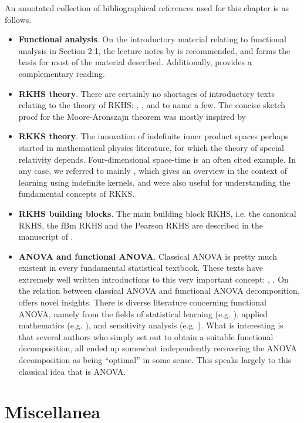 \documentclass[a4paper,showframe,11pt]{report}
\begin{document}
An annotated collection of bibliographical references used for this chapter is as follows.
\begin{itemize}
  \item \textbf{Functional analysis}. On the introductory material relating to functional analysis in Section 2.1, the lecture notes by \citet{sejdinovic2012} is recommended, and forms the basis for most of the material described. Additionally, \citet{rudin1987real} provides a complementary reading.
  \item \textbf{RKHS theory}. There are certainly no shortages of introductory texts relating to the theory of RKHS: \citet{steinwart2008support}, \citet{berlinet2011reproducing}, and \citet{gu2013smoothing} to name a few. The concise sketch proof for the Moore-Aronszajn theorem was mostly inspired by \citet[Theorem 4]{hein2004kernels}
  \item \textbf{RKKS theory}. The innovation of indefinite inner product spaces perhaps started in mathematical physics literature, for which the theory of special relativity depends. Four-dimensional space-time is an often cited example. In any case, we referred to mainly \citet{ong2004learning}, which gives an overview in the context of learning using indefinite kernels. \citet{alpay1991some} and \citet{zafeiriou2012subspace} were also useful for understanding the fundamental concepts of RKKS.
  \item \textbf{RKHS building blocks}. The main building block RKHS, i.e. the canonical RKHS, the fBm RKHS and the Pearson RKHS are described in the manuscript of \citet{bergsma2017}.
  \item \textbf{ANOVA and functional ANOVA}. Classical ANOVA is pretty much existent in every fundamental statistical textbook. These texts have extremely well written introductions to this very important concept: \citet[Ch. 11]{casella2002statistical}, \citet[Ch. 3]{dean1999design}. On the relation between classical ANOVA and functional ANOVA decomposition, \citet{gu2013smoothing} offers novel insights. There is diverse literature concerning functional ANOVA, namely from the fields of statistical learning (e.g. \cite{wahba1990spline}), applied mathematics (e.g. \cite{kuo2010decompositions}), and sensitivity analysis (e.g. \cite{sobol2001global,durrande2013anova}). What is interesting is that several authors who simply set out to obtain a suitable functional decomposition, all ended up somewhat independently recovering the ANOVA decomposition as being ``optimal'' in some sense. This speaks largely to this classical idea that is ANOVA.
\end{itemize}

\section*{Miscellanea}



\hClosingStuffStandalone
\end{document}
